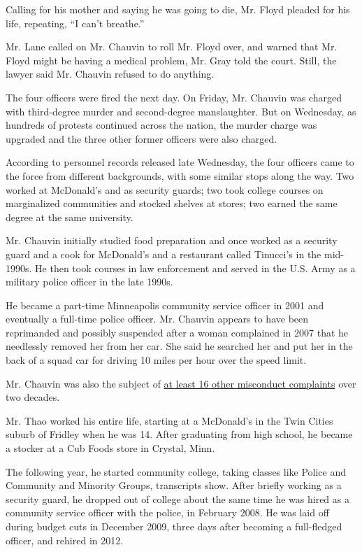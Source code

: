 Calling for his mother and saying he was going to die, Mr. Floyd pleaded
for his life, repeating, ``I can't breathe.''

Mr. Lane called on Mr. Chauvin to roll Mr. Floyd over, and warned that
Mr. Floyd might be having a medical problem, Mr. Gray told the court.
Still, the lawyer said Mr. Chauvin refused to do anything.

The four officers were fired the next day. On Friday, Mr. Chauvin was
charged with third-degree murder and second-degree manslaughter. But on
Wednesday, as hundreds of protests continued across the nation, the
murder charge was upgraded and the three other former officers were also
charged.

According to personnel records released late Wednesday, the four
officers came to the force from different backgrounds, with some similar
stops along the way. Two worked at McDonald's and as security guards;
two took college courses on marginalized communities and stocked shelves
at stores; two earned the same degree at the same university.

Mr. Chauvin initially studied food preparation and once worked as a
security guard and a cook for McDonald's and a restaurant called
Tinucci's in the mid-1990s. He then took courses in law enforcement and
served in the U.S. Army as a military police officer in the late 1990s.

He became a part-time Minneapolis community service officer in 2001 and
eventually a full-time police officer. Mr. Chauvin appears to have been
reprimanded and possibly suspended after a woman complained in 2007 that
he needlessly removed her from her car. She said he searched her and put
her in the back of a squad car for driving 10 miles per hour over the
speed limit.

Mr. Chauvin was also the subject of
\href{https://www.nytimes3xbfgragh.onion/2020/05/30/us/derek-chauvin-george-floyd.html}{at
least 16 other misconduct complaints} over two decades.

Mr. Thao worked his entire life, starting at a McDonald's in the Twin
Cities suburb of Fridley when he was 14. After graduating from high
school, he became a stocker at a Cub Foods store in Crystal, Minn.

The following year, he started community college, taking classes like
Police and Community and Minority Groups, transcripts show. After
briefly working as a security guard, he dropped out of college about the
same time he was hired as a community service officer with the police,
in February 2008. He was laid off during budget cuts in December 2009,
three days after becoming a full-fledged officer, and rehired in 2012.

